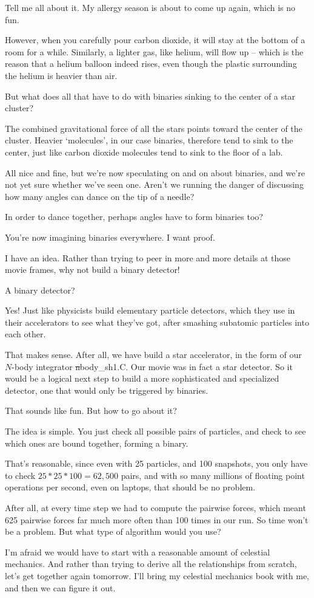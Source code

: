 \carol
Tell me all about it.  My allergy season is about to come up again,
which is no fun.

\alice
However, when you carefully pour carbon dioxide, it will stay at the
bottom of a room for a while.  Similarly, a lighter gas, like helium,
will flow up -- which is the reason that a helium balloon indeed rises,
even though the plastic surrounding the helium is heavier than air.

\bob
But what does all that have to do with binaries sinking to the center
of a star cluster?

\alice
The combined gravitational force of all the stars points toward the
center of the cluster.  Heavier `molecules', in our case binaries,
therefore tend to sink to the center, just like carbon dioxide
molecules tend to sink to the floor of a lab.

\carol
All nice and fine, but we're now speculating on and on about binaries,
and we're not yet sure whether we've seen one.  Aren't we running the
danger of discussing how many angles can dance on the tip of a needle?

\bob
In order to dance together, perhaps angles have to form binaries too?

\carol
You're now imagining binaries everywhere.  I want proof.

\alice
I have an idea.  Rather than trying to peer in more and more details
at those movie frames, why not build a binary detector!

\bob
A binary detector?

\alice
Yes!  Just like physicists build elementary particle detectors,
which they use in their accelerators to see what they've got, after
smashing subatomic particles into each other.

\bob
That makes sense.  After all, we have build a star accelerator, in the
form of our $N$-body integrator {\st nbody\_sh1.C}.  Our movie was in
fact a star detector.  So it would be a logical next step to build a
more sophisticated and specialized detector, one that would only be
triggered by binaries.

\carol
That sounds like fun.  But how to go about it?

\alice
The idea is simple.  You just check all possible pairs of particles,
and check to see which ones are bound together, forming a binary.

\carol
That's reasonable, since even with 25 particles, and 100 snapshots,
you only have to check $25*25*100 = 62,500$ pairs, and with so many
millions of floating point operations per second, even on laptops,
that should be no problem.

\bob
After all, at every time step we had to compute the pairwise forces,
which meant 625 pairwise forces far much more often than 100 times in
our run.  So time won't be a problem.  But what type of algorithm
would you use?

\alice
I'm afraid we would have to start with a reasonable amount of
celestial mechanics.  And rather than trying to derive all the
relationships from scratch, let's get together again tomorrow.
I'll bring my celestial mechanics book with me, and then we can
figure it out.

\cba


